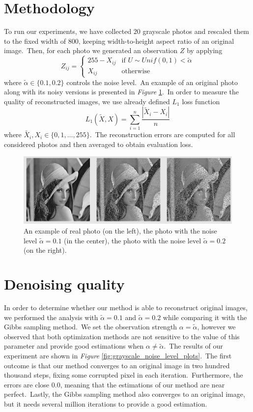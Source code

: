 \documentclass[a4paper, 11pt, onecolumn, openany, titlepage]{report}
\theoremstyle{default_theorem_style}\newtheorem{theorem}{Theorem}
\theoremstyle{default_theorem_style}\newtheorem{definition}{Definition}
\begin{document}
\section{Methodology}

To run our experiments, we have collected $20$ grayscale photos and rescaled them to the fixed width of $800$,
keeping width-to-height aspect ratio of an original image.\ Then, for each photo we generated an
observation $Z$ by applying
$$
Z_{ij} =
\begin{cases}
  255 - X_{ij} &\text{if $U \sim Unif(0, 1) < \tilde{\alpha}$}\\
  X_{ij} &\text{otherwise}
\end{cases}
$$
where $\tilde{\alpha} \in \{0.1, 0.2\}$ controls the noise level.\ An example of an original photo along with
its noisy versions is presented in \textit{Figure} \ref{fig:grayscale_data_examples}.\ In order to
measure the quality of reconstructed images, we use already defined $L_1$ loss function
$$
L_1(\tilde{X}, X) = \sum\limits_{i = 1}^n \frac{|\tilde{X}_i - X_i|}{n}
$$
where $\tilde{X_i}, X_i \in \{0, 1,  \dots, 255\}$.\ The reconstruction errors are computed for all considered
photos and then averaged to obtain evaluation loss.

\begin{figure}[H]
\centering
\includegraphics[scale=0.46]{grayscale_data_examples}
\caption{An example of real photo (on the left), the photo with the noise level $\tilde{\alpha} = 0.1$
(in the center), the photo with the noise level $\tilde{\alpha} = 0.2$ (on the right).}
\label{fig:grayscale_data_examples}
\end{figure}

\section{Denoising quality}

In order to determine whether our method is able to reconstruct original images, we performed the analysis with
$\tilde{\alpha} = 0.1$ and $\tilde{\alpha} = 0.2$ while comparing it with the Gibbs sampling method.\ We set
the observation strength $\alpha = \tilde{\alpha}$, however we observed that both optimization methods are not
sensitive to the value of this parameter and provide good estimations when $\alpha \neq \tilde{\alpha}$.\ The
results of our experiment are shown in \textit{Figure} \ref{fig:grayscale_noise_level_plots}.\ The first outcome
is that our method converges to an original image in two hundred thousand steps, fixing some corrupted pixel in each
iteration.\ Furthermore, the errors are close $0.0$, meaning that the estimations of our method are near
perfect.\ Lastly, the Gibbs sampling method also converges to an original image, but it needs several million
iterations to provide a good estimation.
\end{document}
